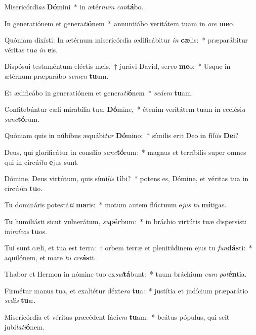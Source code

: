 \item Misericórdi\textit{as} \textbf{Dó}mini~* in ætér\textit{num} \textit{can}\textbf{tá}bo.
\item In generatiónem et genera\textit{ti}\textbf{ó}nem~* annuntiábo veritátem tuam in \textit{o}\textit{re} \textbf{me}o.
\item Quóniam dixísti: In ætérnum misericórdia ædificábitur \textit{in} \textbf{cæ}lis:~* præparábitur véritas tu\textit{a} \textit{in} \textbf{e}is.
\item Dispósui testaméntum eléctis meis,~† jurávi David, ser\textit{vo} \textbf{me}o:~* Usque in ætérnum præparábo \textit{se}\textit{men} \textbf{tu}um.
\item Et ædificábo in generatiónem et genera\textit{ti}\textbf{ó}nem~* \textit{se}\textit{dem} \textbf{tu}am.
\item Confitebúntur cæli mirabília tu\textit{a}, \textbf{Dó}mine,~* étenim veritátem tuam in ecclési\textit{a} \textit{sanc}\textbf{tó}rum.
\item Quóniam quis in núbibus æquábi\textit{tur} \textbf{Dó}mino:~* símilis erit Deo in fí\textit{li}\textit{is} \textbf{De}i?
\item Deus, qui glorificátur in consílio \textit{sanc}\textbf{tó}rum:~* magnus et terríbilis super omnes qui in circú\textit{i}\textit{tu} \textbf{e}jus sunt.
\item Dómine, Deus virtútum, quis sími\textit{lis} \textbf{ti}bi?~* potens es, Dómine, et véritas tua in circú\textit{i}\textit{tu} \textbf{tu}o.
\item Tu domináris potestá\textit{ti} \textbf{ma}ris:~* motum autem flúctuum e\textit{jus} \textit{tu} \textbf{mí}tigas.
\item Tu humiliásti sicut vulnerátum, \textit{su}\textbf{pér}bum:~* in bráchio virtútis tuæ dispersísti ini\textit{mí}\textit{cos} \textbf{tu}os.
\item Tui sunt cæli, et tua est terra:~† orbem terræ et plenitúdinem ejus tu \textit{fun}\textbf{dás}ti:~* aquilónem, et mare \textit{tu} \textit{cre}\textbf{ás}ti.
\item Thabor et Hermon in nómine tuo ex\textit{sul}\textbf{tá}bunt:~* tuum bráchium \textit{cum} \textit{pot}\textbf{én}tia.
\item Firmétur manus tua, et exaltétur déxte\textit{ra} \textbf{tu}a:~* justítia et judícium præparátio \textit{se}\textit{dis} \textbf{tu}æ.
\item Misericórdia et véritas præcédent fáci\textit{em} \textbf{tu}am:~* beátus pópulus, qui scit jubi\textit{la}\textit{ti}\textbf{ó}nem.
